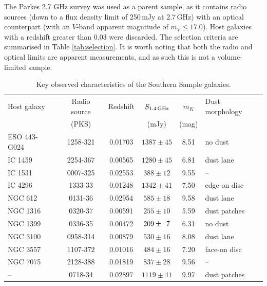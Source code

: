 	The Parkes 2.7 GHz survey \citep{Ekers1989} was used as a parent sample, as it contains radio sources (down to a flux density limit of 250\,mJy at 2.7\,GHz) with an optical counterpart (with an $V$-band apparent magnitude of $m_V \le 17.0$). Host galaxies with a redshift greater than 0.03 were discarded. The selection criteria are summarised in Table \ref{tab:selection}. It is worth noting that both the radio and optical limits are apparent measurements, and as such this is not a volume-limited sample.

	\begin{table}
		\centering
	\begin{threeparttable}
		\caption{Key observed characteristics of the Southern Sample galaxies.}
		\label{tab:sample}
		\begin{tabular}{l c c c c l}
			\hline
			\hline
			Host galaxy	& Radio source 	& Redshift	& $S_\text{1.4\,GHz}$	& $m_K$ & Dust morphology\\
						& (PKS) 		& 			& (mJy) 			& (mag)	&\\
			\hline 
			ESO 443-G024 & 1258-321 	& 0.01703	& $1387 \pm 45$		& 8.51 & no dust\tnote{a}	\\ 
			IC 1459 	& 2254-367 		& 0.00565 	& $1280 \pm 45$		& 6.81 & dust lane\tnote{b}	\\
			IC 1531 	& 0007-325 		& 0.02553 	& \leavevmode\phantom{0}$388 \pm 12$		& 9.55 & --					\\
			IC 4296		& 1333-\leavevmode\phantom{0}33 		& 0.01248 	& $1342 \pm 41$		& 7.50 & edge-on disc\tnote{b} \\
			NGC 612 	& 0131-\leavevmode\phantom{0}36 		& 0.02954 	& \leavevmode\phantom{0}$585 \pm 18$		& 9.58 & dust lane\tnote{c}	\\
			NGC 1316 	& 0320-\leavevmode\phantom{0}37 & 0.00591 	& \leavevmode\phantom{0}$255 \pm 10$		& 5.59 & dust patches\tnote{b} \\
			NGC 1399 	& 0336-\leavevmode\phantom{0}35 & 0.00472 	& \leavevmode\phantom{0}$209 \pm \leavevmode\phantom{0}7$	& 6.31 & no dust\tnote{b}	\\
			NGC 3100 	& 0958-314 		& 0.00879 	& \leavevmode\phantom{0}$530 \pm 16$		& 8.08 & dust lane\tnote{d}	\\
			NGC 3557 	& 1107-372 		& 0.01016 	& \leavevmode\phantom{0}$484 \pm 16$		& 7.20 & face-on disc\tnote{b}\\
			NGC 7075 	& 2128-388 		& 0.01819 	& \leavevmode\phantom{0}$837 \pm 28$		& 9.56 & --					\\
			--			& 0718-\leavevmode\phantom{0}34 		& 0.02897 	& $1119 \pm 41$		& 9.97 & dust patches\tnote{e} \\

\end{tabular}
\end{threeparttable}
\end{table}
